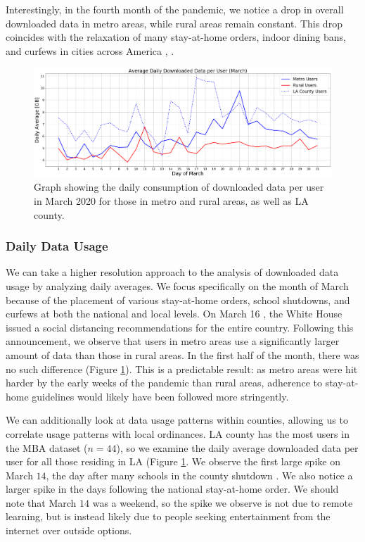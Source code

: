 Interestingly, in the fourth month of the pandemic, we notice a drop in overall downloaded data in metro areas, while rural areas remain constant. This drop coincides with the relaxation of many stay-at-home orders, indoor dining bans, and curfews in cities across America \cite{money2020la}, \cite{gov2020nyc}. 

\begin{figure}
\centering
\includegraphics[width=1.0\linewidth]{figs/daily_downloaded_data.png}
\caption{Graph showing the daily consumption of downloaded data per user in March 2020 for those in metro and rural areas, as well as LA county.}
\label{fig:dailymetro_rural}
\end{figure}

\subsubsection{Daily Data Usage}
We can take a higher resolution approach to the analysis of downloaded data usage by analyzing daily averages. We focus specifically on the month of March because of the placement of various stay-at-home orders, school shutdowns, and curfews at both the national and local levels. On March 16 \citep{trump2020coronavirus}, the White House issued a social distancing recommendations for the entire country. Following this announcement, we observe that users in metro areas use a significantly larger amount of data than those in rural areas. In the first half of the month, there was no such difference (Figure \ref{fig:dailymetro_rural}). This is a predictable result: as metro areas were hit harder by the early weeks of the pandemic than rural areas, adherence to stay-at-home guidelines would likely have been followed more stringently. 

We can additionally look at data usage patterns within counties, allowing us to correlate usage patterns with local ordinances. LA county has the most users in the MBA dataset ($n=44$), so we examine the daily average downloaded data per user for all those residing in LA (Figure \ref{fig:dailymetro_rural}. We observe the first large spike on March $14$, the day after many schools in the county shutdown \citep{haire2020LA}. We also notice a larger spike in the days following the national stay-at-home order. We should note that March $14$ was a weekend, so the spike we observe is not due to remote learning, but is instead likely due to people seeking entertainment from the internet over outside options. 

